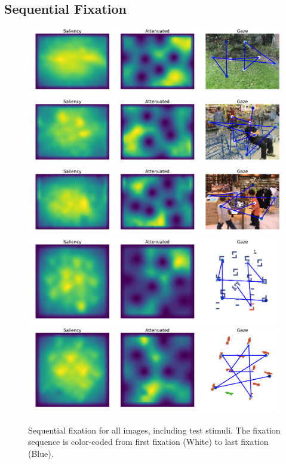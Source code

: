 \documentclass[a4paper,twocolumn,10pt]{article}
\begin{document}
\clearpage
\begin{appendix}
\onecolumn

\section{Sequential Fixation}
  \begin{figure}[ht]
    \centering
    \includegraphics[width=.8\textwidth]{fig/sequence-0.pdf}
    \includegraphics[width=.8\textwidth]{fig/sequence-1.pdf}
    \includegraphics[width=.8\textwidth]{fig/sequence-2.pdf}
    \includegraphics[width=.8\textwidth]{fig/sequence-4.pdf}
    \includegraphics[width=.8\textwidth]{fig/sequence-5.pdf}
    \caption{Sequential fixation for all images, including test stimuli.
    The fixation sequence is color-coded from first fixation (White) to last fixation (Blue).
    }
    \label{fig:app-sequential}
  \end{figure}

\clearpage

\end{appendix}
\end{document}
